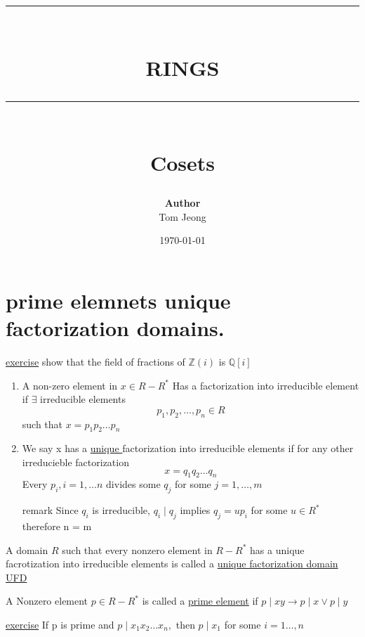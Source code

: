 \documentclass{article}
\newcommand{\HRule}[1]{\rule{\linewidth}{#1}}
\begin{document}

\title{ \normalsize \textsc{}
		\\ [2.0cm]
		\HRule{1.5pt} \\
		\LARGE \textbf{\uppercase{RINGS}}
		\HRule{2.0pt} \\ [0.6cm] \LARGE{Cosets}
		}

\date{\today}
\author{\textbf{Author} \\ 
		Tom Jeong
        }

\maketitle
\newpage

\tableofcontents
\newpage

\section{prime elemnets unique factorization domains.}

\underline{exercise}
show that the field of fractions of $\mathbb{Z}(i)$ is $\mathbb{Q}[i]$ 

\begin{definition}
    \begin{enumerate}
        \item A non-zero element in $x \in R - R^*$ Has a factorization into irreducible element if $\exists $ irreducible elements $$p_1, p_2, \dots, p_n \in R$$ such that $x = p_1p_2 \dots p_n$
        \item We say x has a \underline{unique } factorization into irreducible elements if for any other irreducieble factorization $$x = q_1q_2 \dots q_n$$  Every $p_i, i = 1, \dots n$ divides some $q_j$ for some $j = 1, \dots, m$
        \item[remark] Since $q_i$ is irreducible, $q_i \mid q_j$ implies $q_j = u p_i$ for some $u \in R^*$ therefore n = m
    \end{enumerate}


\end{definition}

\begin{definition}
    A domain $R$ such that every nonzero element in $R - R^*$ has a unique facrotization into irreducible elements is called a \underline{unique factorization domain UFD} 


\end{definition}
\begin{definition}
    A Nonzero element $p \in R- R^*$ is called a \underline{prime element} if $p \mid xy \rightarrow p \mid x \vee  p \mid y$ 
    
\end{definition}
\underline{exercise} If p is prime and $p \mid x_1x_2 \dots x_n, $ then $p \mid x_1$ for some $i = 1 \dots ,n$ 
\end{document}
